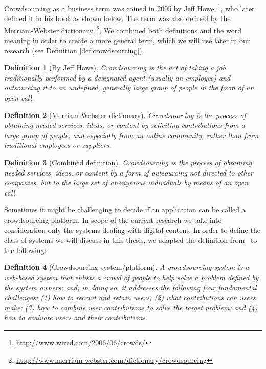 \documentclass[ngerman,UKenglish,table]{scrbook}
\newtheorem{definition}{Definition}
\begin{document}
Crowdsourcing as a business term was coined in 2005 by Jeff Howe~\footnote{\url{http://www.wired.com/2006/06/crowds/}}, who later defined it in his book as shown below.
The term was also defined by the Merriam-Webster dictionary~\footnote{\url{http://www.merriam-webster.com/dictionary/crowdsourcing}}.
We combined both definitions and the word meaning in order to create a more general term, which we will use later in our research (see Definition \autoref{def:crowdsourcing}).

\begin{definition}[By Jeff Howe]
Crowdsourcing is the act of taking a job traditionally performed by a designated agent (usually an employee) and outsourcing it to an undefined, generally large group of people in the form of an open call.
\end{definition}

\begin{definition}[Merriam-Webster dictionary]
Crowdsourcing is the process of obtaining needed services, ideas, or content by soliciting contributions from a large group of people, and especially from an online community, rather than from traditional employees or suppliers.
\end{definition}

\begin{definition}[Combined definition]
\label{def:crowdsourcing}
Crowdsourcing is the process of obtaining needed services, ideas, or content by a form of outsourcing not directed to other companies, but to the large set of anonymous individuals by means of an open call.
\end{definition}

Sometimes it might be challenging to decide if an application can be called a crowdsourcing platform.
In scope of the current research we take into consideration only the systems dealing with digital content. 
In order to define the class of systems we will discuss in this thesis, we adapted the definition from~\cite{doan2011crowdsourcing} to the following:

\begin{definition}[Crowdsourcing system/platform] 
\label{def:cs_system}
A crowdsourcing system is a web-based system that enlists a crowd of people to help solve a problem defined by the system owners; and, in doing so, it addresses the following four fundamental challenges: (1) how to recruit and retain users; (2) what contributions can users make; (3) how to combine user contributions to solve the target problem; and (4) how to evaluate users and their contributions.
\end{definition}
\end{document}
